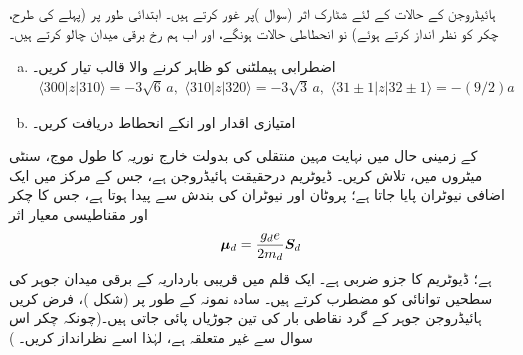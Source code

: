  ہائیڈروجن کے  حالات کے لئے شٹارک اثر (سوال )پر غور کرتے ہیں۔ ابتدائی طور پر (پہلے کی طرح، چکر کو نظر انداز کرتے ہوئے) نو انحطاطی حالات 
 ہونگے، اور اب ہم  رخ برقی میدان چالو کرتے ہیں۔
\begin{enumerate}[a.]
\item
اضطرابی ہیملٹنی کو ظاہر کرنے والا  قالب تیار کریں۔ 
\begin{align*}
\langle 300|z|310\rangle =-3\sqrt{6}\,a,\,\,\langle 310|z|320\rangle =-3\sqrt{3}\,a,\,\,\langle 31\pm1|z|32\pm1\rangle=-(9/2)a
\end{align*}
\item 
امتیازی اقدار اور انکے انحطاط دریافت کریں۔ 
\end{enumerate}
 کے زمینی حال  میں نہایت مہین منتقلی کی بدولت خارج نوریہ کا طول موج، سنٹی میٹروں میں، تلاش کریں۔ ڈیوٹریم درحقیقت  ہائیڈروجن ہے، جس کے مرکز میں ایک اضافی نیوٹران پایا جاتا ہے؛ پروٹان اور نیوٹران کی بندش سے  پیدا ہوتا ہے، جس کا چکر  اور مقناطیسی معیار اثر
\begin{align*}
{\ensuremath{{\boldsymbol{\mu}}}}_{d}=\frac{g_{d}e}{2m_{d}}{{\boldsymbol{S}}}_{d}
\end{align*}
ہے؛ ڈیوٹریم کا  جزو ضربی  ہے۔
 ایک قلم میں قریبی بارداریہ کے برقی میدان جوہر کی سطحیں توانائی کو مضطرب کرتے ہیں۔ سادہ نمونہ کے طور پر (شکل )، فرض کریں ہائیڈروجن جوہر کے گرد نقاطی بار کی تین جوڑیاں پائی جاتی ہیں۔(چونکہ چکر اس سوال سے غیر متعلقہ ہے، لہٰذا اسے نظرانداز کریں۔ )
 
